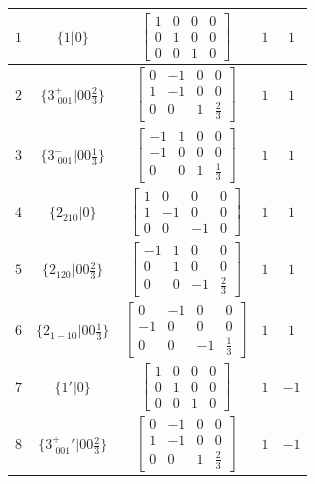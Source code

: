 \documentclass[fleqn,8pt]{jsarticle}
\begin{document}
\begin{longtable}{ccccc}
$ 1 $ & $ \{1|0\} $ & $ \begin{bmatrix} 1 & 0 & 0 & 0 \\ 0 & 1 & 0 & 0 \\ 0 & 0 & 1 & 0 \end{bmatrix} $ & $ 1 $ & $ 1 $ \\ \hline
$ 2 $ & $ \{3^{+}_{\,\,001}|0 0 \frac{2}{3}\} $ & $ \begin{bmatrix} 0 & -1 & 0 & 0 \\ 1 & -1 & 0 & 0 \\ 0 & 0 & 1 & \frac{2}{3} \end{bmatrix} $ & $ 1 $ & $ 1 $ \\ \hline
$ 3 $ & $ \{3^{-}_{\,\,001}|0 0 \frac{1}{3}\} $ & $ \begin{bmatrix} -1 & 1 & 0 & 0 \\ -1 & 0 & 0 & 0 \\ 0 & 0 & 1 & \frac{1}{3} \end{bmatrix} $ & $ 1 $ & $ 1 $ \\ \hline
$ 4 $ & $ \{2{}_{210}|0\} $ & $ \begin{bmatrix} 1 & 0 & 0 & 0 \\ 1 & -1 & 0 & 0 \\ 0 & 0 & -1 & 0 \end{bmatrix} $ & $ 1 $ & $ 1 $ \\ \hline
$ 5 $ & $ \{2{}_{120}|0 0 \frac{2}{3}\} $ & $ \begin{bmatrix} -1 & 1 & 0 & 0 \\ 0 & 1 & 0 & 0 \\ 0 & 0 & -1 & \frac{2}{3} \end{bmatrix} $ & $ 1 $ & $ 1 $ \\ \hline
$ 6 $ & $ \{2{}_{1-10}|0 0 \frac{1}{3}\} $ & $ \begin{bmatrix} 0 & -1 & 0 & 0 \\ -1 & 0 & 0 & 0 \\ 0 & 0 & -1 & \frac{1}{3} \end{bmatrix} $ & $ 1 $ & $ 1 $ \\ \hline
$ 7 $ & $ \{1{}'|0\} $ & $ \begin{bmatrix} 1 & 0 & 0 & 0 \\ 0 & 1 & 0 & 0 \\ 0 & 0 & 1 & 0 \end{bmatrix} $ & $ 1 $ & $ -1 $ \\ \hline
$ 8 $ & $ \{3^{+}_{\,\,001}{}'|0 0 \frac{2}{3}\} $ & $ \begin{bmatrix} 0 & -1 & 0 & 0 \\ 1 & -1 & 0 & 0 \\ 0 & 0 & 1 & \frac{2}{3} \end{bmatrix} $ & $ 1 $ & $ -1 $ \\ \hline

\end{longtable}
\end{document}
